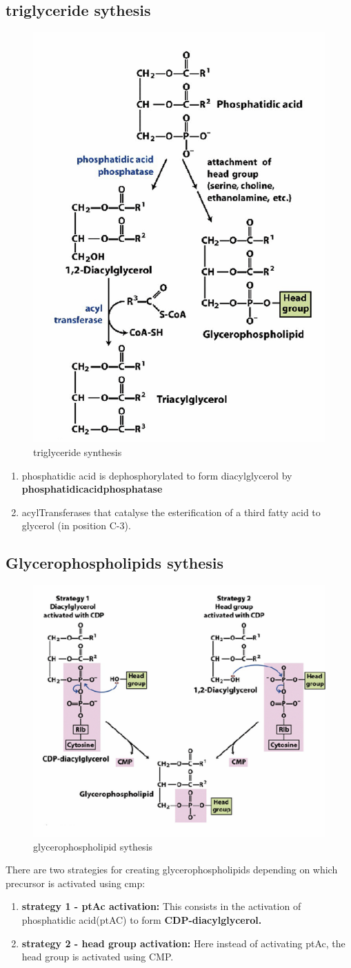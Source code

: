 \documentclass[../main.tex]{subfiles}
\begin{document}
\subsection{triglyceride sythesis}
\begin{figure}[H]
    \centering
    \includegraphics[width=0.4\linewidth]{TAG_syth.png}
    \caption{triglyceride synthesis}
    \label{fig:enter-label}
\end{figure}
\begin{enumerate}
    \item phosphatidic acid is dephosphorylated to form diacylglycerol by \textbf{\gls{phosphatidicacidphosphatase}}
    
    \item \gls{acylTransferases} that catalyse the esterification of a third fatty acid to glycerol (in position C-3).
\end{enumerate}


\subsection{Glycerophospholipids sythesis}
\begin{figure}[H]
    \centering
    \includegraphics[width=0.5\linewidth]{glycerophospholipid.png}
    \caption{glycerophospholipid sythesis}
    \label{fig:enter-label}
\end{figure}
There are two strategies for creating glycerophospholipids depending on which precursor is activated using cmp:
\begin{enumerate}
    \item \textbf{strategy 1 - ptAc activation:} This consists in the activation of phosphatidic acid(ptAC) to form \textbf{CDP-diacylglycerol.}

    \item \textbf{strategy 2 - head group activation:} Here instead of activating ptAc, the head group is activated using CMP.
\end{enumerate}
\end{document}
